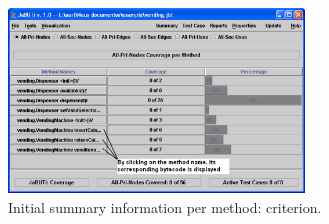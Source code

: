 \begin{figure}[!ht]
\begin{center}
\includegraphics[width=0.70\textwidth]{fig/summary-by-method-initial}
\caption{\label{fig:initial-summary-method} Initial summary
information per method:  criterion.}
\end{center}
\end{figure}
